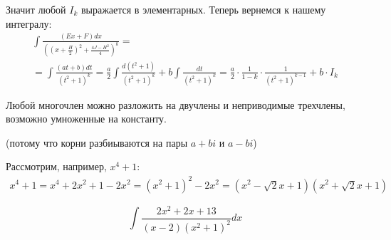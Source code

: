 \begin{enumerate}
        Значит любой \( I_k \) выражается в элементарных. Теперь вернемся к нашему интегралу:
        \begin{gather*}
            \int \frac{\left( Ex + F \right) dx}{\left( \left( x + \frac{H}{2} \right)^2 + \frac{4J - H^2}{4} \right)^k}
            =
            \\
            =
            \int \frac{(at + b) dt}{(t^2 + 1)^k}
            =
            \frac{a}{2} \int \frac{d(t^2 + 1)}{(t^2 + 1)^k} + b \int \frac{dt}{(t^2 + 1)^k}
            =
            \frac{a}{2} \cdot \frac{1}{1 - k} \cdot \frac{1}{(t^2 + 1)^{k - 1}} + b \cdot I_k
        \end{gather*}
\end{enumerate}

\begin{thrm}{}{}
    Любой многочлен можно разложить на двучлены и неприводимые трехчлены, возможно умноженные на константу.

    (потому что корни разбиываются на пары \( a + bi \) и \( a - bi \))
\end{thrm}

\begin{example}{}{}
    Рассмотрим, например, \( x^4 + 1 \):
    \begin{gather*}
        x^4 + 1 = x^4 + 2x^2 + 1 - 2x^2 = (x^2 + 1)^2 - 2x^2 = (x^2 - \sqrt{2}x + 1)(x^2 + \sqrt{2}x + 1)
    \end{gather*}
\end{example}

\begin{example}{}{}
    \[
        \int \frac{2x^2 + 2x + 13}{(x - 2)(x^2 + 1)^2} dx
    \]
\end{example}

